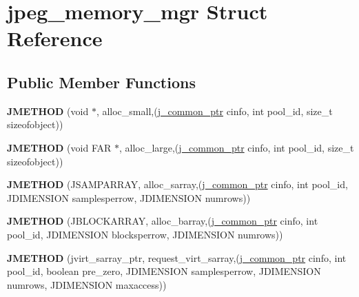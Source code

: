 \hypertarget{structjpeg__memory__mgr}{}\section{jpeg\+\_\+memory\+\_\+mgr Struct Reference}
\label{structjpeg__memory__mgr}
\subsection*{Public Member Functions}
\begin{DoxyCompactItemize}
\item 
\mbox{\label{structjpeg__memory__mgr_a9372ad24444dda23175cc9203105911c}} 
{\bfseries J\+M\+E\+T\+H\+OD} (void $\ast$, alloc\+\_\+small,(\hyperlink{structjpeg__common__struct}{j\+\_\+common\+\_\+ptr} cinfo, int pool\+\_\+id, size\+\_\+t sizeofobject))
\item 
\mbox{\label{structjpeg__memory__mgr_a130f6dbc700cc045bdbe35beff2cb326}} 
{\bfseries J\+M\+E\+T\+H\+OD} (void F\+AR $\ast$, alloc\+\_\+large,(\hyperlink{structjpeg__common__struct}{j\+\_\+common\+\_\+ptr} cinfo, int pool\+\_\+id, size\+\_\+t sizeofobject))
\item 
\mbox{\label{structjpeg__memory__mgr_a3fdd2e1dfdc089fd61f17b608c0263f2}} 
{\bfseries J\+M\+E\+T\+H\+OD} (J\+S\+A\+M\+P\+A\+R\+R\+AY, alloc\+\_\+sarray,(\hyperlink{structjpeg__common__struct}{j\+\_\+common\+\_\+ptr} cinfo, int pool\+\_\+id, J\+D\+I\+M\+E\+N\+S\+I\+ON samplesperrow, J\+D\+I\+M\+E\+N\+S\+I\+ON numrows))
\item 
\mbox{\label{structjpeg__memory__mgr_aefc8abe884dab5648c1e4e7ada2e2e18}} 
{\bfseries J\+M\+E\+T\+H\+OD} (J\+B\+L\+O\+C\+K\+A\+R\+R\+AY, alloc\+\_\+barray,(\hyperlink{structjpeg__common__struct}{j\+\_\+common\+\_\+ptr} cinfo, int pool\+\_\+id, J\+D\+I\+M\+E\+N\+S\+I\+ON blocksperrow, J\+D\+I\+M\+E\+N\+S\+I\+ON numrows))
\item 
\mbox{\label{structjpeg__memory__mgr_a34b830d9d7b2f4fd043e98421a700503}} 
{\bfseries J\+M\+E\+T\+H\+OD} (jvirt\+\_\+sarray\+\_\+ptr, request\+\_\+virt\+\_\+sarray,(\hyperlink{structjpeg__common__struct}{j\+\_\+common\+\_\+ptr} cinfo, int pool\+\_\+id, boolean pre\+\_\+zero, J\+D\+I\+M\+E\+N\+S\+I\+ON samplesperrow, J\+D\+I\+M\+E\+N\+S\+I\+ON numrows, J\+D\+I\+M\+E\+N\+S\+I\+ON maxaccess))

\end{DoxyCompactItemize}
